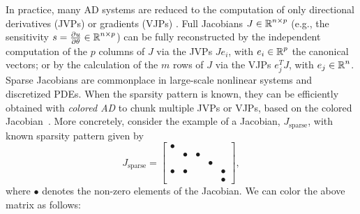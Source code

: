 In practice, many AD systems are reduced to the computation of only directional derivatives (JVPs) or gradients (VJPs) \cite{Griewank:2008kh}.
Full Jacobians $J \in \operatorname{\mathbb{R}}^{n \times p}$ (e.g., the sensitivity $s = \frac{\partial u}{\partial \theta} \in \operatorname{\mathbb{R}}^{n \times p}$) can be fully reconstructed by the independent computation of the $p$ columns of $J$ via the JVPs $J e_i$, with $e_i \in \operatorname{\mathbb{R}}^p$ the canonical vectors; or by the calculation of the $m$ rows of $J$ via the VJPs $e_j^T J$, with $e_j \in \operatorname{\mathbb{R}}^n$.
Sparse Jacobians are commonplace in large-scale nonlinear systems and discretized PDEs. 
When the sparsity pattern is known, they can be efficiently obtained with \textit{colored AD} to chunk multiple JVPs or VJPs, based on the colored Jacobian~\cite{gebremedhin2005color}.
More concretely, consider the example of a Jacobian, ${J}_{\text{sparse}}$, with known sparsity pattern given by
\begin{equation}
    {J}_{\text{sparse}} = \begin{bmatrix}
        \bullet &         &         &         &         \\
                & \bullet & \bullet &         &         \\
                &         &         & \bullet &         \\
        \bullet & \bullet &         &         & \bullet \\
                &         &         &         & \bullet
    \end{bmatrix},
\end{equation}
where $\bullet$ denotes the non-zero elements of the Jacobian. 
We can color the above matrix as follows:
